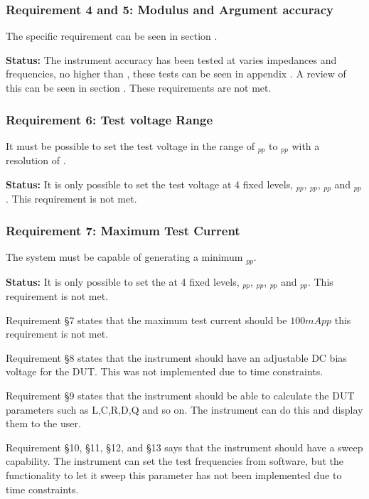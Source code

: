 \subsubsection*{Requirement 4 and 5: Modulus and Argument accuracy}
The specific requirement can be seen in section .

\textbf{Status:} The instrument accuracy has been tested at varies impedances and frequencies, no higher than , these tests can be seen in appendix . A review of this can be seen in section . These requirements are not met.
\nl
\nl

\subsubsection*{Requirement 6: Test voltage Range}
It must be possible to set the test voltage in the range of $_{pp}$ to $_{pp}$ with a resolution of .

\textbf{Status:} It is only possible to set the test voltage at 4 fixed levels, $_{pp}$, $_{pp}$, $_{pp}$ and $_{pp}$. This requirement is not met.
\nl
\nl

\subsubsection*{Requirement 7: Maximum Test Current}
The system must be capable of generating a minimum $_{pp}$.

\textbf{Status:} It is only possible to set the at 4 fixed levels, $_{pp}$, $_{pp}$, $_{pp}$ and $_{pp}$. This requirement is not met.
\nl
\nl

Requirement §7 states that the maximum test current should be $100mApp$ this requirement is not met.

Requirement §8 states that the instrument should have an adjustable DC bias voltage for the DUT. This was not implemented due to time constraints.

Requirement §9 states that the instrument should be able to calculate the DUT parameters such as L,C,R,D,Q and so on. The instrument can do this and display them to the user.

Requirement §10, §11, §12, and §13 says that the instrument should have a sweep capability. The instrument can set the test frequencies from software, but the functionality to let it sweep this parameter has not been implemented due to time constraints.

